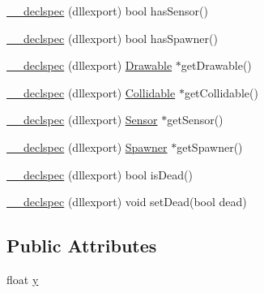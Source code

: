 \begin{DoxyCompactItemize}
\item 
\hyperlink{class_game_component_ac9aaef1c89eafbd0c3959a096253a402}{\-\_\-\-\_\-declspec} (dllexport) bool has\-Sensor()
\item 
\hyperlink{class_game_component_a394efd23d349b977eea088fd132e7c9f}{\-\_\-\-\_\-declspec} (dllexport) bool has\-Spawner()
\item 
\hyperlink{class_game_component_a08bc91b41fde1cb87b3e88d8c595222f}{\-\_\-\-\_\-declspec} (dllexport) \hyperlink{class_drawable}{Drawable} $\ast$get\-Drawable()
\item 
\hyperlink{class_game_component_ae57117756a03743effd35b247b47128d}{\-\_\-\-\_\-declspec} (dllexport) \hyperlink{class_collidable}{Collidable} $\ast$get\-Collidable()
\item 
\hyperlink{class_game_component_a415eee32585e17c54627fd8e82bafda4}{\-\_\-\-\_\-declspec} (dllexport) \hyperlink{class_sensor}{Sensor} $\ast$get\-Sensor()
\item 
\hyperlink{class_game_component_a9b1178bf248e3249d13e56e49119012d}{\-\_\-\-\_\-declspec} (dllexport) \hyperlink{class_spawner}{Spawner} $\ast$get\-Spawner()
\item 
\hyperlink{class_game_component_a52514a034b067ce785a1be3f7fc20f2a}{\-\_\-\-\_\-declspec} (dllexport) bool is\-Dead()
\item 
\hyperlink{class_game_component_a5a034014ede12c085ba1b55d8fca6d1c}{\-\_\-\-\_\-declspec} (dllexport) void set\-Dead(bool dead)
\end{DoxyCompactItemize}
\subsection*{Public Attributes}
\begin{DoxyCompactItemize}
\item 
float \hyperlink{class_game_component_a8a40aa75eff388a7da06668d3d2fe87c}{y}
\end{DoxyCompactItemize}
